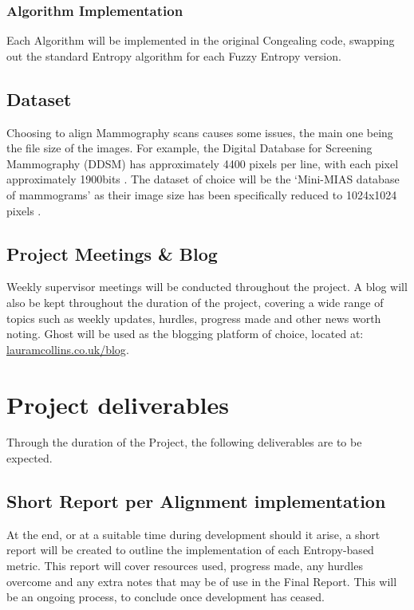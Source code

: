 \documentclass[11pt,fleqn,twoside]{article}
\begin{document}
  \subsubsection{Algorithm Implementation}
  Each Algorithm will be implemented in the original Congealing code, swapping out the standard Entropy algorithm for each Fuzzy Entropy version.

\subsection{Dataset}
Choosing to align Mammography scans causes some issues, the main one being the file size of the images. For example, the Digital Database for Screening Mammography (DDSM) has approximately 4400 pixels per line, with each pixel approximately 1900bits \cite{ddsm-paper}. The dataset of choice will be the `Mini-MIAS database of mammograms' as their image size has been specifically reduced to 1024x1024 pixels \cite{suckling1994mammographic}.

\subsection{Project Meetings \& Blog}
Weekly supervisor meetings will be conducted throughout the project. A blog will also be kept throughout the duration of the project, covering a wide range of topics such as weekly updates, hurdles, progress made and other news worth noting. Ghost will be used as the blogging platform of choice, located at: \url{lauramcollins.co.uk/blog}.

\section{Project deliverables}
Through the duration of the Project, the following deliverables are to be expected.

\subsection{Short Report per Alignment implementation}
At the end, or at a suitable time during development should it arise, a short report will be created to outline the implementation of each Entropy-based metric. This report will cover resources used, progress made, any hurdles overcome and any extra notes that may be of use in the Final Report. This will be an ongoing process,  to conclude once development has ceased.
\end{document}
